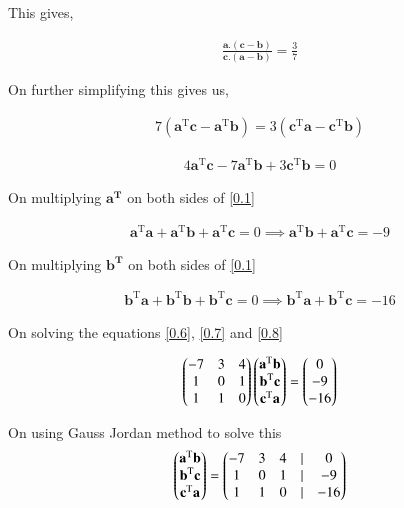 \documentclass[journal]{IEEEtran}
\begin{document}
This gives,

\begin{align}
    \frac{\textbf{a}.(\textbf{c}-\textbf{b})}{\textbf{c}.(\textbf{a}-\textbf{b})}=\frac{3}{7}
    \label{0.4}
\end{align}

On further simplifying this gives us,

\begin{align}
    7(\textbf{a}^{\text{T}}\textbf{c}-\textbf{a}^{\text{T}}\textbf{b})=3(\textbf{c}^{\text{T}}\textbf{a}-\textbf{c}^{\text{T}}\textbf{b})
    \label{0.5}
\end{align}

\begin{align}
    4\textbf{a}^{\text{T}}\textbf{c}-7\textbf{a}^{\text{T}}\textbf{b}+3\textbf{c}^{\text{T}}\textbf{b}=0
    \label{0.6}
\end{align}

On multiplying $\textbf{a}^{\textbf{T}}$ on both sides of \ref{0.1}

\begin{align}
    \textbf{a}^{\text{T}}\textbf{a}+\textbf{a}^{\text{T}}\textbf{b}+\textbf{a}^{\text{T}}\textbf{c}=0 \implies \textbf{a}^{\text{T}}\textbf{b}+\textbf{a}^{\text{T}}\textbf{c}=-9
    \label{0.7}
\end{align}

On multiplying $\textbf{b}^{\textbf{T}}$ on both sides of \ref{0.1}

\begin{align}
    \textbf{b}^{\text{T}}\textbf{a}+\textbf{b}^{\text{T}}\textbf{b}+\textbf{b}^{\text{T}}\textbf{c}=0 \implies \textbf{b}^{\text{T}}\textbf{a}+\textbf{b}^{\text{T}}\textbf{c}=-16
    \label{0.8}
\end{align}

On solving the equations \ref{0.6}, \ref{0.7} and \ref{0.8}

\begin{align}
    \begin{pmatrix}-7 & 3 & 4 \\ 1 & 0 & 1\\1 & 1 & 0\end{pmatrix} \begin{pmatrix}\textbf{a}^\text{T}\textbf{b}\\\textbf{b}^\text{T}\textbf{c}\\\textbf{c}^\text{T}\textbf{a}\\\end{pmatrix}=\begin{pmatrix}0\\-9\\-16\end{pmatrix}
    \label{0.9}
\end{align}

On using Gauss Jordan method to solve this
\begin{align}
    \begin{pmatrix}\textbf{a}^\text{T}\textbf{b}\\\textbf{b}^\text{T}\textbf{c}\\\textbf{c}^\text{T}\textbf{a}\\\end{pmatrix}=\begin{pmatrix}-7 & 3 & 4 &| & 0\\1& 0 & 1 & | &-9\\1&1&0&|&-16\end{pmatrix}
    \label{0.10}
\end{align}
\end{document}
